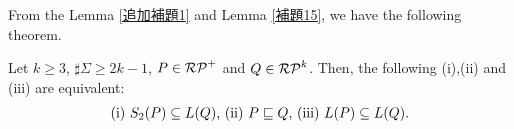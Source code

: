 From the Lemma \ref{追加補題1} and Lemma \ref{補題15},
we have the following theorem.


\begin{thm}\label{定理17}
    Let $k \geq 3$, $\sharp\Sigma \geq 2k-1$, $P \in \mathcal{RP}^{+}$ and
    $Q \in \mathcal{RP}^{k}$.
    Then, the following (i),(ii) and (iii) are equivalent:
    \[
        \begin{tabular}{ll}
            $(\mathrm{i})$ $S_{2}(P) \subseteq L(Q)$,
            $(\mathrm{ii})$ $P \sqsubseteq Q$,
            $(\mathrm{iii})$ $L(P) \subseteq L(Q)$.
        \end{tabular}
    \]
\end{thm}


